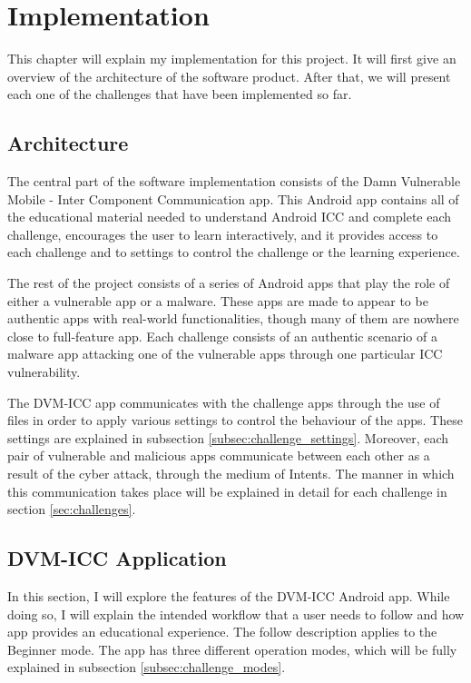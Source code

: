 \chapter{Implementation}
    \label{chap:implementation}

   This chapter will explain my implementation for this project. It will first give an overview of the architecture of the software product. After that, we will present each one of the challenges that have been implemented so far.

    \section{Architecture} 
        \label{sec:architecture}
        
    The central part of the software implementation consists of the Damn Vulnerable Mobile - Inter Component Communication app. This Android app contains all of the educational material needed to understand Android ICC and complete each challenge, encourages the user to learn interactively,  and it provides access to each challenge and to settings to control the challenge or the learning experience. 
    
    The rest of the project consists of a series of Android apps that play the role of either a vulnerable app or a malware. These apps are made to appear to be authentic apps with real-world functionalities, though many of them are nowhere close to full-feature app. Each challenge consists of an authentic scenario of a malware app attacking one of the vulnerable apps through one particular ICC vulnerability.
    
    The DVM-ICC app communicates with the challenge apps through the use of files in order to apply various settings to control the behaviour of the apps. These settings are explained in subsection \ref{subsec:challenge_settings}. Moreover, each pair of vulnerable and malicious apps communicate between each other as a result of the cyber attack, through the medium of Intents. The manner in which this communication takes place will be explained in detail for each challenge in section \ref{sec:challenges}.
    
    \section{DVM-ICC Application}
        \label{sec:home_app}
        
    In this section, I will explore the features of the DVM-ICC Android app. While doing so, I will explain the intended workflow that a user needs to follow and how app provides an educational experience. The follow description applies to the Beginner mode. The app has three different operation modes, which will be fully explained in subsection \ref{subsec:challenge_modes}.
    
